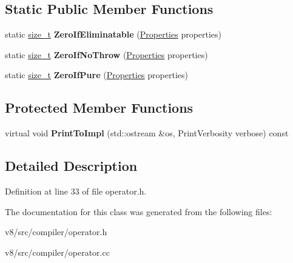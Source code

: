 \subsection*{Static Public Member Functions}
\begin{DoxyCompactItemize}
\item 
\mbox{\label{classv8_1_1internal_1_1compiler_1_1Operator_abfd4399c6dc901728864bf616c52b5ce}} 
static \mbox{\hyperlink{classsize__t}{size\+\_\+t}} {\bfseries Zero\+If\+Eliminatable} (\mbox{\hyperlink{classv8_1_1base_1_1Flags}{Properties}} properties)
\item 
\mbox{\label{classv8_1_1internal_1_1compiler_1_1Operator_a33ac290c997f8d9889d20c6e34b7d622}} 
static \mbox{\hyperlink{classsize__t}{size\+\_\+t}} {\bfseries Zero\+If\+No\+Throw} (\mbox{\hyperlink{classv8_1_1base_1_1Flags}{Properties}} properties)
\item 
\mbox{\label{classv8_1_1internal_1_1compiler_1_1Operator_ac05d4213206e14d84b683018c2e996d5}} 
static \mbox{\hyperlink{classsize__t}{size\+\_\+t}} {\bfseries Zero\+If\+Pure} (\mbox{\hyperlink{classv8_1_1base_1_1Flags}{Properties}} properties)
\end{DoxyCompactItemize}
\subsection*{Protected Member Functions}
\begin{DoxyCompactItemize}
\item 
\mbox{\label{classv8_1_1internal_1_1compiler_1_1Operator_a1b0f06d10c0293b8545b3ce37313bb44}} 
virtual void {\bfseries Print\+To\+Impl} (std\+::ostream \&os, Print\+Verbosity verbose) const
\end{DoxyCompactItemize}


\subsection{Detailed Description}


Definition at line 33 of file operator.\+h.



The documentation for this class was generated from the following files\+:\begin{DoxyCompactItemize}
\item 
v8/src/compiler/operator.\+h\item 
v8/src/compiler/operator.\+cc\end{DoxyCompactItemize}
